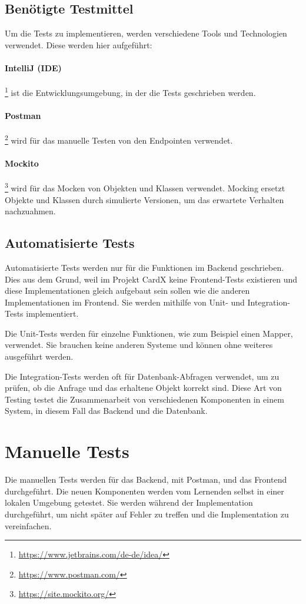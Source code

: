 \subsection{Benötigte Testmittel}
Um die Tests zu implementieren, werden verschiedene Tools und Technologien verwendet. Diese werden hier aufgeführt:

\paragraph{IntelliJ (IDE)} \footnote{\url{https://www.jetbrains.com/de-de/idea/}} ist die Entwicklungsumgebung, in der die Tests geschrieben werden.
\paragraph{Postman} \footnote{\url{https://www.postman.com/}} wird für das manuelle Testen von den Endpointen verwendet.
\paragraph{Mockito} \footnote{\url{https://site.mockito.org/}} wird für das Mocken von Objekten und Klassen verwendet. Mocking ersetzt Objekte und Klassen durch simulierte Versionen, um das erwartete Verhalten nachzuahmen.

\subsection{Automatisierte Tests}
Automatisierte Tests werden nur für die Funktionen im Backend geschrieben. Dies aus dem Grund, weil im Projekt CardX keine Frontend-Tests existieren und diese Implementationen gleich aufgebaut sein sollen wie die anderen Implementationen im Frontend. Sie werden mithilfe von Unit- und Integration-Tests implementiert.

Die Unit-Tests werden für einzelne Funktionen, wie zum Beispiel einen Mapper, verwendet. Sie brauchen keine anderen Systeme und können ohne weiteres ausgeführt werden.

Die Integration-Tests werden oft für Datenbank-Abfragen verwendet, um zu prüfen, ob die Anfrage und das erhaltene Objekt korrekt sind. Diese Art von Testing testet die Zusammenarbeit von verschiedenen Komponenten in einem System, in diesem Fall das Backend und die Datenbank.

\section{Manuelle Tests}
Die manuellen Tests werden für das Backend, mit Postman, und das Frontend durchgeführt. Die neuen Komponenten werden vom Lernenden selbst in einer lokalen Umgebung getestet. Sie werden während der Implementation durchgeführt, um nicht später auf Fehler zu treffen und die Implementation zu vereinfachen.



\newpage